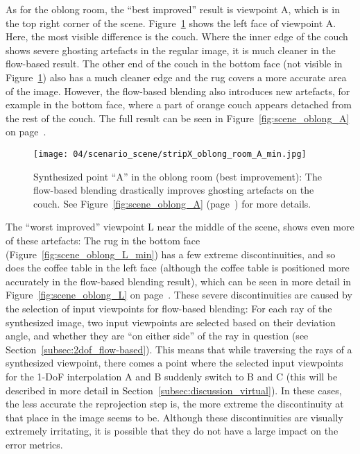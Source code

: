 As for the oblong room, the ``best improved'' result is viewpoint A, which is in the top right corner of the scene. Figure~\ref{fig:scene_oblong_A_min} shows the left face of viewpoint A. Here, the most visible difference is the couch. Where the inner edge of the couch shows severe ghosting artefacts in the regular image, it is much cleaner in the flow-based result. The other end of the couch in the bottom face (not visible in Figure~\ref{fig:scene_oblong_A_min}) also has a much cleaner edge and the rug covers a more accurate area of the image. However, the flow-based blending also introduces new artefacts, for example in the bottom face, where a part of orange couch appears detached from the rest of the couch. The full result can be seen in Figure~\ref{fig:scene_oblong_A} on page~\pageref{fig:scene_oblong_A}.

\begin{figure}
  \centering
  \texttt{[image: 04/scenario\_scene/stripX\_oblong\_room\_A\_min.jpg]}
  \caption[Left face of viewpoint ``A'' in the oblong room]{Synthesized point ``A'' in the oblong room (best improvement): The flow-based blending drastically improves ghosting artefacts on the couch. See Figure~\ref{fig:scene_oblong_A} (page~\pageref{fig:scene_oblong_A}) for more details.}
  \label{fig:scene_oblong_A_min}
\end{figure}

The ``worst improved'' viewpoint L near the middle of the scene,  shows even more of these artefacts: The rug in the bottom face (Figure~\ref{fig:scene_oblong_L_min}) has a few extreme discontinuities, and so does the coffee table in the left face (although the coffee table is positioned more accurately in the flow-based blending result), which can be seen in more detail in Figure~\ref{fig:scene_oblong_L} on page~\pageref{fig:scene_oblong_L}.
These severe discontinuities are caused by the selection of input viewpoints for flow-based blending: For each ray of the synthesized image, two input viewpoints are selected based on their deviation angle, and whether they are ``on either side'' of the ray in question (see Section~\ref{subsec:2dof_flow-based}).
This means that while traversing the rays of a synthesized viewpoint, there comes a point where the selected input viewpoints for the 1-DoF interpolation A and B suddenly switch to B and C (this will be described in more detail in Section~\ref{subsec:discussion_virtual}). In these cases, the less accurate the reprojection step is, the more extreme the discontinuity at that place in the image seems to be. Although these discontinuities are visually extremely irritating, it is possible that they do not have a large impact on the error metrics.

